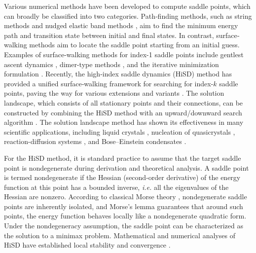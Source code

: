 \documentclass[final]{siamart251216}
\begin{document}
Various numerical methods have been developed to compute saddle points, which can broadly be classified into two categories.
Path‐finding methods, such as string methods \cite{weinan2002string} and nudged elastic band methods \cite{henkelman2000improved}, aim to find the minimum energy path and transition state between initial and final states.
In contrast, surface‐walking methods aim to locate the saddle point starting from an initial guess.
Examples of surface‐walking methods for index-1 saddle points include gentlest ascent dynamics \cite{gad}, dimer-type methods \cite{Henkelman1999,zhang2012shrinking}, and the iterative minimization formulation \cite{gao2015iterative}. 
Recently, the high‐index saddle dynamics (HiSD) method \cite{yin2019high} has provided a unified surface‐walking framework for searching for index-$k$ saddle points, paving the way for various extensions and variants \cite{yin2021searching, luo2025accelerated, su2025improved}. 
The solution landscape, which consists of all stationary points and their connections, can be constructed by combining the HiSD method with an upward/downward search algorithm \cite{YinPRL, yin2021searching, zhang2023review}. 
The solution landscape method has shown its effectiveness in many scientific applications, including liquid crystals \cite{YinPRL, han2021solution}, nucleation of quasicrystals \cite{yin2021transition}, reaction-diffusion systems \cite{WU2025reaction}, and Bose--Einstein condensates \cite{yin2024revealing}. 


For the HiSD method, it is standard practice to assume that the target saddle point is nondegenerate during derivation and theoretical analysis.
A saddle point is termed nondegenerate if the Hessian (second-order derivative) of the energy function at this point has a bounded inverse, \textit{i.e.} all the eigenvalues of the Hessian are nonzero. 
According to classical Morse theory \cite{milnormorse}, nondegenerate saddle points are inherently isolated, and Morse's lemma guarantees that around such points, the energy function behaves locally like a nondegenerate quadratic form.
Under the nondegeneracy assumption, the saddle point can be characterized as the solution to a minimax problem. Mathematical and numerical analyses of HiSD have established local stability and convergence \cite{yin2019high, luo2022convergence, zhang2022sinum, su2025improved}.
\end{document}

